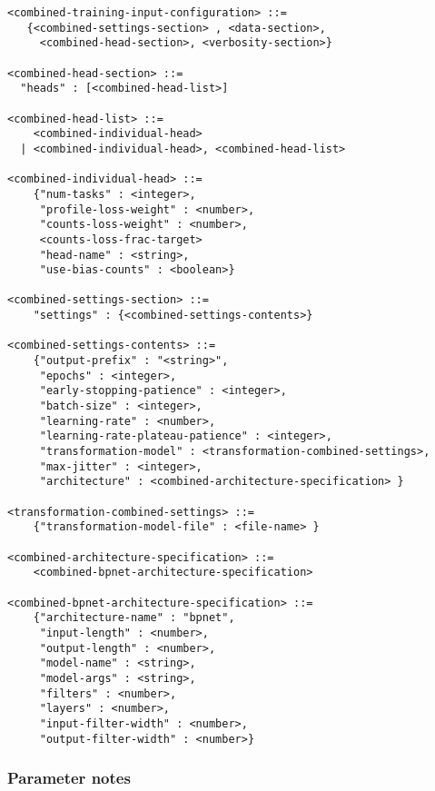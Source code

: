 \documentclass{article}
\begin{document}
\begin{lstlisting}
<combined-training-input-configuration> ::=
   {<combined-settings-section> , <data-section>,
     <combined-head-section>, <verbosity-section>}

<combined-head-section> ::=
  "heads" : [<combined-head-list>]

<combined-head-list> ::=
    <combined-individual-head>
  | <combined-individual-head>, <combined-head-list>

<combined-individual-head> ::=
    {"num-tasks" : <integer>,
     "profile-loss-weight" : <number>,
     "counts-loss-weight" : <number>,
     <counts-loss-frac-target>
     "head-name" : <string>,
     "use-bias-counts" : <boolean>}

<combined-settings-section> ::=
    "settings" : {<combined-settings-contents>}

<combined-settings-contents> ::=
    {"output-prefix" : "<string>",
     "epochs" : <integer>,
     "early-stopping-patience" : <integer>,
     "batch-size" : <integer>,
     "learning-rate" : <number>,
     "learning-rate-plateau-patience" : <integer>,
     "transformation-model" : <transformation-combined-settings>,
     "max-jitter" : <integer>,
     "architecture" : <combined-architecture-specification> }

<transformation-combined-settings> ::=
    {"transformation-model-file" : <file-name> }

<combined-architecture-specification> ::=
    <combined-bpnet-architecture-specification>

<combined-bpnet-architecture-specification> ::=
    {"architecture-name" : "bpnet",
     "input-length" : <number>,
     "output-length" : <number>,
     "model-name" : <string>,
     "model-args" : <string>,
     "filters" : <number>,
     "layers" : <number>,
     "input-filter-width" : <number>,
     "output-filter-width" : <number>}
\end{lstlisting}

\subsubsection{Parameter notes}
\end{document}
